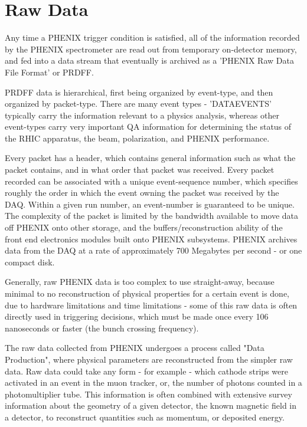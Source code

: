 \section{Raw Data}

Any time a PHENIX trigger condition is satisfied, all of the information
recorded by the PHENIX spectrometer are read out from temporary on-detector
memory, and fed into a data stream that eventually is archived as a 'PHENIX Raw
Data File Format' or PRDFF. 

PRDFF data is hierarchical, first being organized by event-type, and
then organized by packet-type.  There are many event types - 'DATAEVENTS'
typically carry the information relevant to a physics analysis, whereas other
event-types carry very important QA information for determining the status of
the RHIC apparatus, the beam, polarization, and PHENIX performance.

Every packet has a header, which contains general information such as what the
packet contains, and in what order that packet was received. Every packet
recorded can be associated with a unique event-sequence number, which specifies
roughly the order in which the event owning the packet was received by the DAQ.
Within a given run number, an event-number is guaranteed to be unique. The
complexity of the packet is limited by the bandwidth available to move data off
PHENIX onto other storage, and the buffers/reconstruction ability of the front
end electronics modules built onto PHENIX subsystems. PHENIX archives data from
the DAQ at a rate of approximately 700 Megabytes per second - or one compact
disk.

Generally, raw PHENIX data is too complex to use straight-away, because minimal
to no reconstruction of physical properties for a certain event is done, due to
hardware limitations and time limitations - some of this raw data is often
directly used in triggering decisions, which must be made once every 106
nanoseconds or faster (the bunch crossing frequency).

The raw data collected from PHENIX undergoes a process called "Data Production",
where physical parameters are reconstructed from the simpler raw data. Raw data
could take any form - for example - which cathode strips were activated in an
event in the muon tracker, or, the number of photons counted in a
photomultiplier tube. This information is often combined with extensive survey
information about the geometry of a given detector, the known magnetic field in
a detector, to reconstruct quantities such as momentum, or deposited energy.

